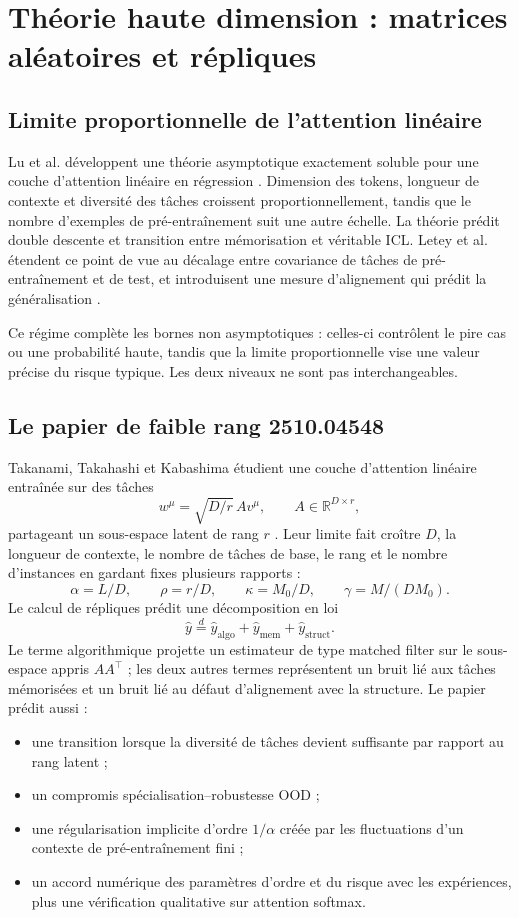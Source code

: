 \documentclass[11pt,a4paper]{article}
\newcommand{\R}{\mathbb{R}}
\begin{document}
\section{Théorie haute dimension : matrices aléatoires et répliques}

\subsection{Limite proportionnelle de l'attention linéaire}

Lu et al. développent une théorie asymptotique exactement soluble pour une
couche d'attention linéaire en régression \cite{lu2025asymptotic}. Dimension
des tokens, longueur de contexte et diversité des tâches croissent
proportionnellement, tandis que le nombre d'exemples de pré-entraînement suit
une autre échelle. La théorie prédit double descente et transition entre
mémorisation et véritable ICL. Letey et al. étendent ce point de vue au
décalage entre covariance de tâches de pré-entraînement et de test, et
introduisent une mesure d'alignement qui prédit la généralisation
\cite{letey2026alignment}.

Ce régime complète les bornes non asymptotiques : celles-ci contrôlent le pire
cas ou une probabilité haute, tandis que la limite proportionnelle vise une
valeur précise du risque typique. Les deux niveaux ne sont pas interchangeables.

\subsection{Le papier de faible rang 2510.04548}

Takanami, Takahashi et Kabashima étudient une couche d'attention linéaire
entraînée sur des tâches
\[
  w^\mu=\sqrt{D/r}\,A v^\mu,\qquad A\in\R^{D\times r},
\]
partageant un sous-espace latent de rang $r$ \cite{takanami2026}. Leur limite
fait croître $D$, la longueur de contexte, le nombre de tâches de base, le rang
et le nombre d'instances en gardant fixes plusieurs rapports :
\[
 \alpha=L/D,\qquad \rho=r/D,\qquad
 \kappa=M_0/D,\qquad \gamma=M/(DM_0).
\]
Le calcul de répliques prédit une décomposition en loi
\[
 \widehat y\overset{d}{=}
 \widehat y_{\mathrm{algo}}+
 \widehat y_{\mathrm{mem}}+
 \widehat y_{\mathrm{struct}}.
\]
Le terme algorithmique projette un estimateur de type matched filter sur le
sous-espace appris $AA^\top$ ; les deux autres termes représentent un bruit lié
aux tâches mémorisées et un bruit lié au défaut d'alignement avec la structure.
Le papier prédit aussi :
\begin{itemize}[leftmargin=*]
  \item une transition lorsque la diversité de tâches devient suffisante par
  rapport au rang latent ;
  \item un compromis spécialisation--robustesse OOD ;
  \item une régularisation implicite d'ordre $1/\alpha$ créée par les
  fluctuations d'un contexte de pré-entraînement fini ;
  \item un accord numérique des paramètres d'ordre et du risque avec les
  expériences, plus une vérification qualitative sur attention softmax.
\end{itemize}
\end{document}
